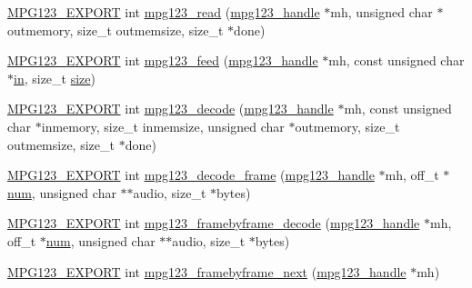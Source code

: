 \begin{DoxyCompactItemize}
\mbox{\hyperlink{mpg123_8h_a2ba98cfba3f760879df70e755b2a61cc}{M\+P\+G123\+\_\+\+E\+X\+P\+O\+RT}} int \mbox{\hyperlink{group__mpg123__input_ga8023e3b24e8a70d9589c6c7567c54a41}{mpg123\+\_\+read}} (\mbox{\hyperlink{group__mpg123__init_ga6728e2839a395f3a07d4514da659faca}{mpg123\+\_\+handle}} $\ast$mh, unsigned char $\ast$outmemory, size\+\_\+t outmemsize, size\+\_\+t $\ast$done)
\item 
\mbox{\hyperlink{mpg123_8h_a2ba98cfba3f760879df70e755b2a61cc}{M\+P\+G123\+\_\+\+E\+X\+P\+O\+RT}} int \mbox{\hyperlink{group__mpg123__input_ga0a50910ce7bf0b30921114a89cc78d29}{mpg123\+\_\+feed}} (\mbox{\hyperlink{group__mpg123__init_ga6728e2839a395f3a07d4514da659faca}{mpg123\+\_\+handle}} $\ast$mh, const unsigned char $\ast$\mbox{\hyperlink{_s_d_l__opengl__glext_8h_a83ad0ee7f1e06b59c90271716e689080}{in}}, size\+\_\+t \mbox{\hyperlink{_s_d_l__opengl__glext_8h_a3d1e3edfcf61ca2d831883e1afbad89e}{size}})
\item 
\mbox{\hyperlink{mpg123_8h_a2ba98cfba3f760879df70e755b2a61cc}{M\+P\+G123\+\_\+\+E\+X\+P\+O\+RT}} int \mbox{\hyperlink{group__mpg123__input_gafaf2382b208257a9685a8cab9f4360be}{mpg123\+\_\+decode}} (\mbox{\hyperlink{group__mpg123__init_ga6728e2839a395f3a07d4514da659faca}{mpg123\+\_\+handle}} $\ast$mh, const unsigned char $\ast$inmemory, size\+\_\+t inmemsize, unsigned char $\ast$outmemory, size\+\_\+t outmemsize, size\+\_\+t $\ast$done)
\item 
\mbox{\hyperlink{mpg123_8h_a2ba98cfba3f760879df70e755b2a61cc}{M\+P\+G123\+\_\+\+E\+X\+P\+O\+RT}} int \mbox{\hyperlink{group__mpg123__input_gabcc91dfcc46df4bdef267b8061ffcce0}{mpg123\+\_\+decode\+\_\+frame}} (\mbox{\hyperlink{group__mpg123__init_ga6728e2839a395f3a07d4514da659faca}{mpg123\+\_\+handle}} $\ast$mh, off\+\_\+t $\ast$\mbox{\hyperlink{_s_d_l__opengl__glext_8h_abb50fc1ead3a02a46fb52daa2045f95c}{num}}, unsigned char $\ast$$\ast$audio, size\+\_\+t $\ast$bytes)
\item 
\mbox{\hyperlink{mpg123_8h_a2ba98cfba3f760879df70e755b2a61cc}{M\+P\+G123\+\_\+\+E\+X\+P\+O\+RT}} int \mbox{\hyperlink{group__mpg123__input_gad6e52cca146bcd6db3954e88fb86bc82}{mpg123\+\_\+framebyframe\+\_\+decode}} (\mbox{\hyperlink{group__mpg123__init_ga6728e2839a395f3a07d4514da659faca}{mpg123\+\_\+handle}} $\ast$mh, off\+\_\+t $\ast$\mbox{\hyperlink{_s_d_l__opengl__glext_8h_abb50fc1ead3a02a46fb52daa2045f95c}{num}}, unsigned char $\ast$$\ast$audio, size\+\_\+t $\ast$bytes)
\item 
\mbox{\hyperlink{mpg123_8h_a2ba98cfba3f760879df70e755b2a61cc}{M\+P\+G123\+\_\+\+E\+X\+P\+O\+RT}} int \mbox{\hyperlink{group__mpg123__input_gad10c57bc8060c64652b014a2593de61a}{mpg123\+\_\+framebyframe\+\_\+next}} (\mbox{\hyperlink{group__mpg123__init_ga6728e2839a395f3a07d4514da659faca}{mpg123\+\_\+handle}} $\ast$mh)

\end{DoxyCompactItemize}

